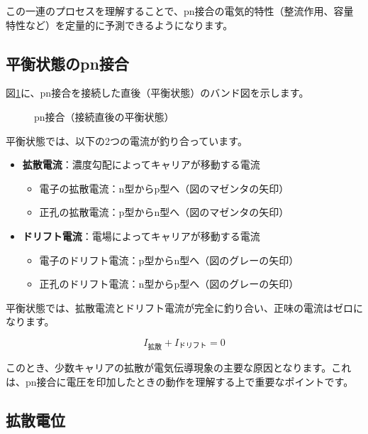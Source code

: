 この一連のプロセスを理解することで、pn接合の電気的特性（整流作用、容量特性など）を定量的に予測できるようになります。

\subsection{平衡状態のpn接合}

図\ref{fig:pn_junction_initial}に、pn接合を接続した直後（平衡状態）のバンド図を示します。

\begin{figure}[H]
\centering
{}
\caption{pn接合（接続直後の平衡状態）}
\label{fig:pn_junction_initial}
\end{figure}

平衡状態では、以下の2つの電流が釣り合っています。

\begin{itemize}
\item \textbf{拡散電流}：濃度勾配によってキャリアが移動する電流
\begin{itemize}
\item 電子の拡散電流：n型からp型へ（図のマゼンタの矢印）
\item 正孔の拡散電流：p型からn型へ（図のマゼンタの矢印）
\end{itemize}

\item \textbf{ドリフト電流}：電場によってキャリアが移動する電流
\begin{itemize}
\item 電子のドリフト電流：p型からn型へ（図のグレーの矢印）
\item 正孔のドリフト電流：n型からp型へ（図のグレーの矢印）
\end{itemize}
\end{itemize}

平衡状態では、拡散電流とドリフト電流が完全に釣り合い、正味の電流はゼロになります。

\begin{equation}
I_{\text{拡散}} + I_{\text{ドリフト}} = 0
\end{equation}

このとき、少数キャリアの拡散が電気伝導現象の主要な原因となります。これは、pn接合に電圧を印加したときの動作を理解する上で重要なポイントです。

\subsection{拡散電位}

